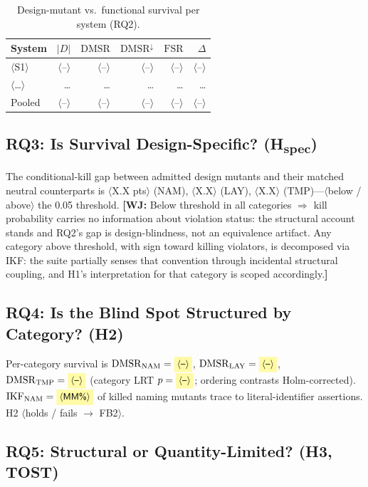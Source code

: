 \documentclass[conference]{IEEEtran}
\newcommand{\ph}[1]{\colorbox{yellow!35}{\small$\langle$\textsf{#1}$\rangle$}}
\newcommand{\wj}[1]{{\color{blue}\footnotesize\textbf{[WJ:} #1\textbf{]}}}
\newcommand{\dmsr}{\mathrm{DMSR}}
\newcommand{\fsr}{\mathrm{FSR}}
\begin{document}
\begin{table}[t]
\centering
\caption{Design-mutant vs.\ functional survival per system (RQ2).}
\label{tab:main}
\begin{tabular}{@{}lrrrrr@{}}
\toprule
System & $|D|$ & $\dmsr$ & $\dmsr^{\downarrow}$ & $\fsr$ & $\Delta$ \\
\midrule
\ph{S1} & \ph{--} & \ph{--} & \ph{--} & \ph{--} & \ph{--} \\
\ph{\dots} & \dots & \dots & \dots & \dots & \dots \\
\midrule
Pooled & \ph{--} & \ph{--} & \ph{--} & \ph{--} & \ph{--} \\
\bottomrule
\end{tabular}
\end{table}

\subsection{RQ3: Is Survival Design-Specific? (H\textsubscript{spec})}\label{sec:results-rq3}

The conditional-kill gap between admitted design mutants and their matched neutral counterparts is \ph{X.X pts} (NAM), \ph{X.X} (LAY), \ph{X.X} (TMP)---\ph{below / above} the 0.05 threshold. \wj{Below threshold in all categories $\Rightarrow$ kill probability carries no information about violation status: the structural account stands and RQ2's gap is design-blindness, not an equivalence artifact. Any category above threshold, with sign toward killing violators, is decomposed via IKF: the suite partially senses that convention through incidental structural coupling, and H1's interpretation for that category is scoped accordingly.}

\subsection{RQ4: Is the Blind Spot Structured by Category? (H2)}\label{sec:results-rq4}

Per-category survival is $\dmsr_{\mathrm{NAM}} = \ph{--}$, $\dmsr_{\mathrm{LAY}} = \ph{--}$, $\dmsr_{\mathrm{TMP}} = \ph{--}$ (category LRT $p = \ph{--}$; ordering contrasts Holm-corrected). $\mathrm{IKF}_{\mathrm{NAM}} = \ph{MM\%}$ of killed naming mutants trace to literal-identifier assertions. H2 \ph{holds / fails $\to$ FB2}.

\subsection{RQ5: Structural or Quantity-Limited? (H3, TOST)}\label{sec:results-rq5}
\end{document}
